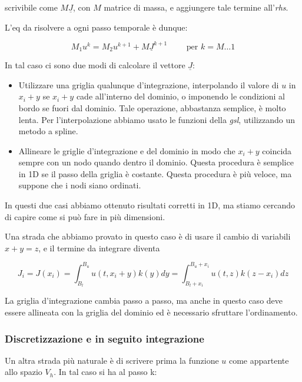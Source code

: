 \documentclass[a4paper,10pt]{article}
\begin{document}
scrivibile come $M\underline{J}$, con $M$ matrice di massa, e aggiungere tale termine all'\emph{rhs}.

L'eq da risolvere a ogni passo temporale è dunque:

\begin{equation*}
 M_1u^k=M_2u^{k+1}+M\underline{J}^{k+1}  \qquad \text{ per } k=M\dots1
\end{equation*}


In tal caso ci sono due modi di calcolare il vettore $\underline{J}:$

\begin{itemize}
 \item Utilizzare una griglia qualunque d'integrazione, interpolando il valore di $u$ in $x_i+y$ se $x_i+y$ cade all'interno del dominio, o imponendo le condizioni al bordo se fuori dal dominio. Tale operazione, abbastanza semplice, è molto lenta. Per l'interpolazione abbiamo usato le funzioni della \emph{gsl}, utilizzando un metodo a spline.
 \item Allineare le griglie d'integrazione e del dominio in modo che $x_i+y$ coincida sempre con un nodo quando dentro il dominio. Questa procedura è semplice in 1D se il passo della griglia è costante. Questa procedura è più veloce, ma suppone che i nodi siano ordinati. 
\end{itemize}

In questi due casi abbiamo ottenuto risultati corretti in 1D, ma stiamo cercando di capire come si può fare in più dimensioni.

Una strada che abbiamo provato in questo caso è di usare il cambio di variabili $x+y=z$, e il termine da integrare diventa

\begin{equation*}
 J_i=J(x_i)=\int_{B_l}^{B_u}u(t,x_i+y)k(y)dy=\int_{B_l+x_i}^{B_u+x_i}u(t,z)k(z-x_i)dz
\end{equation*}

La griglia d'integrazione cambia passo a passo, ma anche in questo caso deve essere allineata con la griglia del dominio ed è necessario sfruttare l'ordinamento.

\subsubsection{Discretizzazione e in seguito integrazione}

Un altra strada più naturale è di scrivere prima la funzione $u$ come appartente allo spazio $V_h$. In tal caso si ha al passo k:
\end{document}
